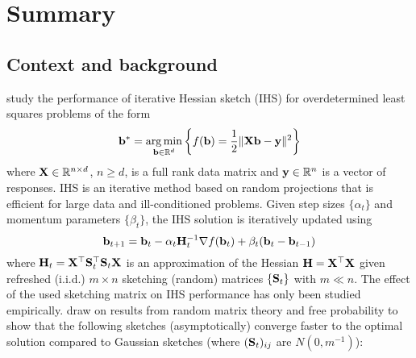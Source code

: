 

\section{Summary}

\subsection{Context and background}

\citet{Lacotte:2020} study the performance of iterative Hessian sketch (IHS) \citep{Pilanci:2016} for overdetermined least squares problems of the form
\[
\mathbf{b}^* = \operatorname*{arg\,min}_{\mathbf{b}\in\mathbb{R}^d}\left\{f(\mathbf{b}) = \frac{1}{2}\|\mathbf{X}\mathbf{b}-\mathbf{y}\|^2\right\}
\]
where $\mathbf{X}\in\mathbb{R}^{n\times d}$, $n\geq d$, is a full rank data matrix and $\mathbf{y}\in\mathbb{R}^n$ is a vector of responses. IHS is an iterative method based on random projections that is efficient for large data and ill-conditioned problems. Given step sizes $\{\alpha_t\}$ and momentum parameters $\{\beta_t\}$, the IHS solution is iteratively updated using
\[
\mathbf{b}_{t+1} = \mathbf{b}_t - \alpha_t\mathbf{H}_t^{-1}\nabla f(\mathbf{b}_t)+\beta_t(\mathbf{b}_t-\mathbf{b}_{t-1})
\]
where $\mathbf{H}_t=\mathbf{X}^\top \mathbf{S}_t^\top \mathbf{S}_t\mathbf{X}$ is an approximation of the Hessian $\mathbf{H}=\mathbf{X}^\top\mathbf{X}$ given refreshed (i.i.d.) $m\times n$ sketching (random) matrices $\{\mathbf{S}_t\}$ with $m\ll n$. The effect of the used sketching matrix on IHS performance has only been studied empirically. \citet{Lacotte:2020} draw on results from random matrix theory and free probability to show that the following sketches (asymptotically) converge faster to the optimal solution compared to \iid Gaussian sketches (where $(\mathbf{S}_t)_{ij}$ are \iid $N(0,m^{-1})$):
